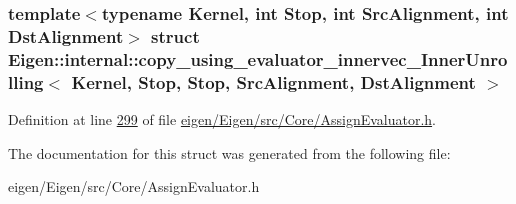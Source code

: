 \subsubsection*{template$<$typename Kernel, int Stop, int Src\+Alignment, int Dst\+Alignment$>$\newline
struct Eigen\+::internal\+::copy\+\_\+using\+\_\+evaluator\+\_\+innervec\+\_\+\+Inner\+Unrolling$<$ Kernel, Stop, Stop, Src\+Alignment, Dst\+Alignment $>$}



Definition at line \hyperlink{eigen_2_eigen_2src_2_core_2_assign_evaluator_8h_source_l00299}{299} of file \hyperlink{eigen_2_eigen_2src_2_core_2_assign_evaluator_8h_source}{eigen/\+Eigen/src/\+Core/\+Assign\+Evaluator.\+h}.



The documentation for this struct was generated from the following file\+:\begin{DoxyCompactItemize}
\item 
eigen/\+Eigen/src/\+Core/\+Assign\+Evaluator.\+h\end{DoxyCompactItemize}

